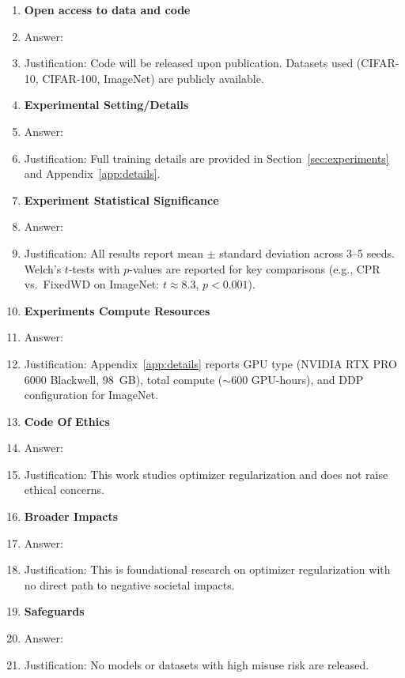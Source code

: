 \documentclass{article}
\begin{document}
\begin{enumerate}
\item {\bf Open access to data and code}
    \item[] Answer: \answerNo{}
    \item[] Justification: Code will be released upon publication. Datasets used (CIFAR-10, CIFAR-100, ImageNet) are publicly available.

\item {\bf Experimental Setting/Details}
    \item[] Answer: \answerYes{}
    \item[] Justification: Full training details are provided in Section~\ref{sec:experiments} and Appendix~\ref{app:details}.

\item {\bf Experiment Statistical Significance}
    \item[] Answer: \answerYes{}
    \item[] Justification: All results report mean $\pm$ standard deviation across 3--5 seeds. Welch's $t$-tests with $p$-values are reported for key comparisons (e.g., CPR vs.\ FixedWD on ImageNet: $t \approx 8.3$, $p < 0.001$).

\item {\bf Experiments Compute Resources}
    \item[] Answer: \answerYes{}
    \item[] Justification: Appendix~\ref{app:details} reports GPU type (NVIDIA RTX PRO 6000 Blackwell, 98~GB), total compute (${\sim}600$ GPU-hours), and DDP configuration for ImageNet.

\item {\bf Code Of Ethics}
    \item[] Answer: \answerYes{}
    \item[] Justification: This work studies optimizer regularization and does not raise ethical concerns.

\item {\bf Broader Impacts}
    \item[] Answer: \answerNA{}
    \item[] Justification: This is foundational research on optimizer regularization with no direct path to negative societal impacts.

\item {\bf Safeguards}
    \item[] Answer: \answerNA{}
    \item[] Justification: No models or datasets with high misuse risk are released.


\end{enumerate}
\end{document}
